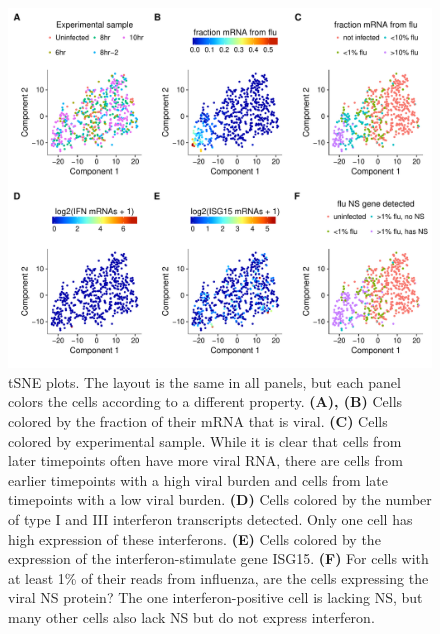 \documentclass[9pt,lineno]{elife}
\begin{document}
\begin{figure}
\includegraphics[width=\linewidth]{figures/p_small_tsne_merge.pdf}
\caption{\label{fig:tsne}
tSNE plots.
The layout is the same in all panels, but each panel colors the cells according to a different property.
{\bf (A), (B)}
Cells colored by the fraction of their mRNA that is viral.
{\bf (C)}
Cells colored by experimental sample.
While it is clear that cells from later timepoints often have more viral RNA, there are cells from earlier timepoints with a high viral burden and cells from late timepoints with a low viral burden.
{\bf (D)}
Cells colored by the number of type I and III interferon transcripts detected.
Only one cell has high expression of these interferons.
{\bf (E)}
Cells colored by the expression of the interferon-stimulate gene ISG15.
{\bf (F)}
For cells with at least 1\% of their reads from influenza, are the cells expressing the viral NS protein?
The one interferon-positive cell is lacking NS, but many other cells also lack NS but do not express interferon.
}
\end{figure}
\end{document}
